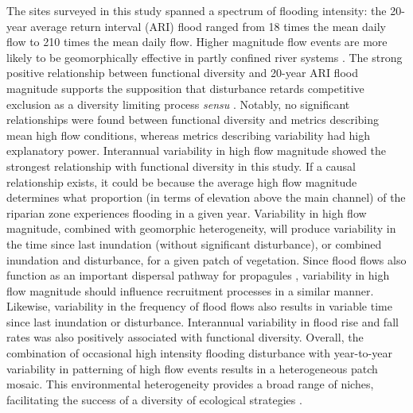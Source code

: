 \documentclass[12pt,a4paper]{memoir}
\begin{document}
The sites surveyed in this study spanned a spectrum of flooding intensity: the 20-year average return interval (ARI) flood ranged from 18 times the mean daily flow to 210 times the mean daily flow. Higher magnitude flow events are more likely to be geomorphically effective in partly confined river systems \citep{Huang2006}. The strong positive relationship between functional diversity and 20-year ARI flood magnitude supports the supposition that disturbance retards competitive exclusion as a diversity limiting process \textit{sensu} \citet{Huston1979}. Notably, no significant relationships were found between functional diversity and metrics describing mean high flow conditions, whereas metrics describing variability had high explanatory power. Interannual variability in high flow magnitude showed the strongest relationship with functional diversity in this study. If a causal relationship exists, it could be because the average high flow magnitude determines what proportion (in terms of elevation above the main channel) of the riparian zone experiences flooding in a given year. Variability in high flow magnitude, combined with geomorphic heterogeneity, will produce variability in the time since last inundation (without significant disturbance), or combined inundation and disturbance, for a given patch of vegetation. Since flood flows also function as an important dispersal pathway for propagules \citep{Merritt2010a}, variability in high flow magnitude should influence recruitment processes in a similar manner.  Likewise, variability in the frequency of flood flows also results in variable time since last inundation or disturbance. Interannual variability in flood rise and fall rates was also positively associated with functional diversity. Overall, the combination of occasional high intensity flooding disturbance with year-to-year variability in patterning of high flow events results in a heterogeneous patch mosaic. This environmental heterogeneity provides a broad range of niches, facilitating the success of a diversity of ecological strategies \citep{Bornette2008}.
 
\end{document}
